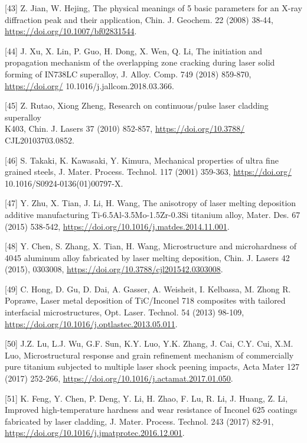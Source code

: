 \documentclass[10pt]{article}
\begin{document}
[43] Z. Jian, W. Hejing, The physical meanings of 5 basic parameters for an X-ray diffraction peak and their application, Chin. J. Geochem. 22 (2008) 38-44, \href{https://doi.org/10.1007/bf02831544}{https://doi.org/10.1007/bf02831544}.

[44] J. Xu, X. Lin, P. Guo, H. Dong, X. Wen, Q. Li, The initiation and propagation mechanism of the overlapping zone cracking during laser solid forming of IN738LC superalloy, J. Alloy. Comp. 749 (2018) 859-870, \href{https://doi.org/}{https://doi.org/} 10.1016/j.jallcom.2018.03.366.

[45] Z. Rutao, Xiong Zheng, Research on continuous/pulse laser cladding superalloy\\
K403, Chin. J. Lasers 37 (2010) 852-857, \href{https://doi.org/10.3788/}{https://doi.org/10.3788/} CJL20103703.0852.

[46] S. Takaki, K. Kawasaki, Y. Kimura, Mechanical properties of ultra fine grained steels, J. Mater. Process. Technol. 117 (2001) 359-363, \href{https://doi.org/}{https://doi.org/} 10.1016/S0924-0136(01)00797-X.

[47] Y. Zhu, X. Tian, J. Li, H. Wang, The anisotropy of laser melting deposition additive manufacturing Ti-6.5Al-3.5Mo-1.5Zr-0.3Si titanium alloy, Mater. Des. 67 (2015) 538-542, \href{https://doi.org/10.1016/j.matdes.2014.11.001}{https://doi.org/10.1016/j.matdes.2014.11.001}.

[48] Y. Chen, S. Zhang, X. Tian, H. Wang, Microstructure and microhardness of 4045 aluminum alloy fabricated by laser melting deposition, Chin. J. Lasers 42 (2015), 0303008, \href{https://doi.org/10.3788/cjl201542.0303008}{https://doi.org/10.3788/cjl201542.0303008}.

[49] C. Hong, D. Gu, D. Dai, A. Gasser, A. Weisheit, I. Kelbassa, M. Zhong R. Poprawe, Laser metal deposition of TiC/Inconel 718 composites with tailored interfacial microstructures, Opt. Laser. Technol. 54 (2013) 98-109, \href{https://doi.org/10.1016/j.optlastec.2013.05.011}{https://doi.org/10.1016/j.optlastec.2013.05.011}.

[50] J.Z. Lu, L.J. Wu, G.F. Sun, K.Y. Luo, Y.K. Zhang, J. Cai, C.Y. Cui, X.M. Luo, Microstructural response and grain refinement mechanism of commercially pure titanium subjected to multiple laser shock peening impacts, Acta Mater 127 (2017) 252-266, \href{https://doi.org/10.1016/j.actamat.2017.01.050}{https://doi.org/10.1016/j.actamat.2017.01.050}.

[51] K. Feng, Y. Chen, P. Deng, Y. Li, H. Zhao, F. Lu, R. Li, J. Huang, Z. Li, Improved high-temperature hardness and wear resistance of Inconel 625 coatings fabricated by laser cladding, J. Mater. Process. Technol. 243 (2017) 82-91, \href{https://doi.org/10.1016/j.jmatprotec.2016.12.001}{https://doi.org/10.1016/j.jmatprotec.2016.12.001}.
\end{document}
